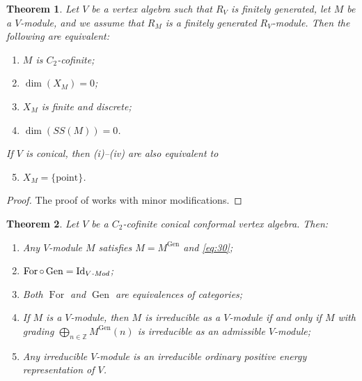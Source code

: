 \documentclass[a4paper, 12pt, reqno]{amsart}
\newtheorem{theorem}{Theorem}[section]
\theoremstyle{remark}
\DeclareMathOperator{\Id}{Id}
\DeclareMathOperator{\For}{For}
\DeclareMathOperator{\Gen}{Gen}
\begin{document}
\begin{theorem}
  \label{thr:61}
  Let $V$ be a vertex algebra such that $R_V$ is finitely generated, let $M$ be a $V$-module, and we assume that $R_M$ is a finitely generated $R_V$-module.
  Then the following are equivalent:
  \begin{enumerate}
  \item $M$ is $C_2$-cofinite;
  \item $\dim(X_M) = 0$;
  \item $X_M$ is finite and discrete;
  \item $\dim(SS(M)) = 0$.
  \end{enumerate}
  If $V$ is conical, then \emph{(i)--(iv)} are also equivalent to
  \begin{enumerate}
    \setcounter{enumi}{4}
  \item $X_M = \{\mathrm{point}\}$.
  \end{enumerate}
\end{theorem}

\begin{proof}
  The proof of  works with minor modifications.
\end{proof}

\begin{theorem}
  \label{thr:62}
  Let $V$ be a $C_2$-cofinite conical conformal vertex algebra.
  Then:
  \begin{enumerate}
  \item Any $V$-module $M$ satisfies $M = M^{\Gen}$ and \eqref{eq:30};
  \item $\For\circ\Gen = \Id_{\text{\emph{$V$-Mod}}}$;
  \item Both $\For$ and $\Gen$ are equivalences of categories;
  \item If $M$ is a $V$-module, then $M$ is irreducible as a $V$-module if and only if $M$ with grading $\bigoplus_{n \in \mathbb{Z}}M^{\Gen}(n)$ is irreducible as an admissible $V$-module;
  \item Any irreducible $V$-module is an irreducible ordinary positive energy representation of $V$.
  \end{enumerate}
\end{theorem}
\end{document}
